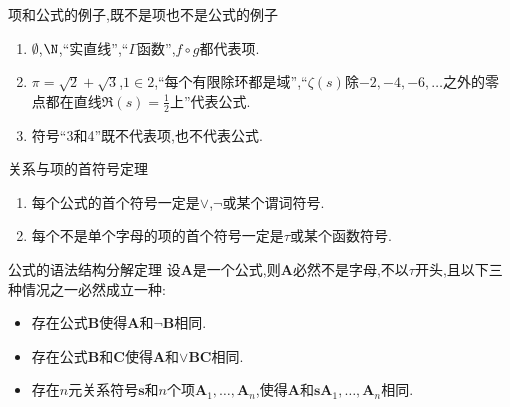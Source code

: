 \begin{example}{项和公式的例子,既不是项也不是公式的例子}{}
	\begin{enumerate}
		\item $\emptyset$,$\N$,``实直线'',``$\Gamma$函数'',$f\circ g$都代表项.
		\item $\pi=\sqrt{2}+\sqrt{3}$,$1\in 2$,``每个有限除环都是域'',``$\zeta\left(s\right)$除$-2,-4,-6,\ldots$之外的零点都在直线$\Re\left(s\right)=\frac{1}{2}$上''代表公式.
		\item 符号``3和4''既不代表项,也不代表公式.
	\end{enumerate}
\end{example}

\begin{metatheorem}{关系与项的首符号定理}{}
	\begin{enumerate}
		\item 每个公式的首个符号一定是$\vee$,$\neg$或某个谓词符号.
		\item 每个不是单个字母的项的首个符号一定是$\tau$或某个函数符号.
	\end{enumerate}
\end{metatheorem}

\begin{metatheorem}{公式的语法结构分解定理}{}
	设$\boldsymbol{A}$是一个公式,则$\boldsymbol{A}$必然不是字母,不以$\tau$开头,且以下三种情况之一必然成立一种:
	\begin{itemize}
		\item 存在公式$\boldsymbol{B}$使得$\boldsymbol{A}$和$\neg\boldsymbol{B}$相同.
		\item 存在公式$\boldsymbol{B}$和$\boldsymbol{C}$使得$\boldsymbol{A}$和$\vee\boldsymbol{B}\boldsymbol{C}$相同.
		\item 存在$n$元关系符号$\boldsymbol{s}$和$n$个项$\boldsymbol{A}_{1},\ldots,\boldsymbol{A}_{n}$,使得$\boldsymbol{A}$和$\boldsymbol{s}\boldsymbol{A}_{1},\ldots,\boldsymbol{A}_{n}$相同.
	\end{itemize}
\end{metatheorem}
